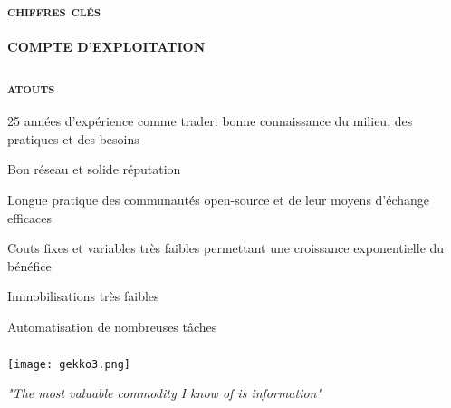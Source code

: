 \documentclass[14pt,a4paper]{beamer}
\begin{document}
\begin{frame}
\frametitle{\color{title}\bf\textsc{chiffres clés}}
\framesubtitle{\color{tex}\bf\footnotesize{COMPTE D'EXPLOITATION}}


\end{frame}


\begin{frame}
\frametitle{\color{title}\bf\textsc{atouts}}

 25 années d'expérience comme trader: bonne connaissance du milieu, des pratiques et des besoins\\
\pause

 Bon réseau et solide réputation
\pause

 Longue pratique des communautés open-source et de leur moyens d'échange efficaces
\pause

 Couts fixes et variables très faibles permettant une croissance exponentielle du bénéfice
\pause

 Immobilisations très faibles 
\pause

 Automatisation de nombreuses tâches 

\end{frame}

\begin{frame}
\begin{center}
\frametitle{\color{title}{GORDON...GO TRADINGHALL.COM !}}


\texttt{[image: gekko3.png]}

\emph{"The most valuable commodity I know of is information"}\\

\end{center}
\end{frame}

\end{document}
